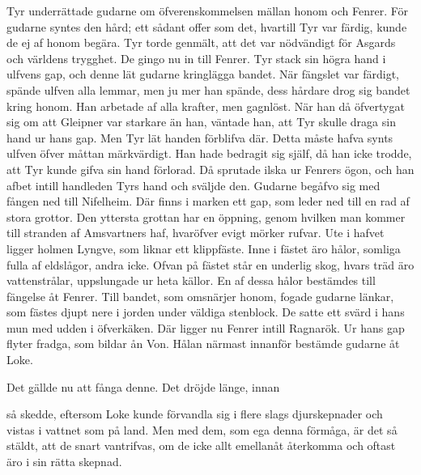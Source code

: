 Tyr underrättade gudarne om öfverenskommelsen mällan honom och Fenrer.
För gudarne syntes den hård; ett sådant offer som det, hvartill Tyr var
färdig, kunde de ej af honom begära. Tyr torde genmält, att det var
nödvändigt för Asgards och världens trygghet. De gingo nu in till
Fenrer. Tyr stack sin högra hand i ulfvens gap, och denne lät gudarne
kringlägga bandet. När fängslet var färdigt, spände ulfven alla lemmar,
men ju mer han spände, dess hårdare drog sig bandet kring honom. Han
arbetade af alla krafter, men gagnlöst. När han då öfvertygat sig om att
Gleipner var starkare än han, väntade han, att Tyr skulle draga sin hand
ur hans gap. Men Tyr lät handen förblifva där. Detta måste hafva synts
ulfven öfver måttan märkvärdigt. Han hade bedragit sig själf, då han
icke trodde, att Tyr kunde gifva sin hand förlorad. Då sprutade ilska ur
Fenrers ögon, och han afbet intill handleden Tyrs hand och sväljde den.
Gudarne begåfvo sig med fången ned till Nifelheim. Där finns i marken
ett gap, som leder ned till en rad af stora grottor. Den yttersta
grottan har en öppning, genom hvilken man kommer till stranden af
Amsvartners haf, hvaröfver evigt mörker rufvar. Ute i hafvet ligger
holmen Lyngve, som liknar ett klippfäste. Inne i fästet äro hålor,
somliga fulla af eldslågor, andra icke. Ofvan på fästet står en underlig
skog, hvars träd äro vattenstrålar, uppslungade ur heta källor. En af
dessa hålor bestämdes till fängelse åt Fenrer. Till bandet, som
omsnärjer honom, fogade gudarne länkar, som fästes djupt nere i jorden
under väldiga stenblock. De satte ett svärd i hans mun med udden i
öfverkäken. Där ligger nu Fenrer intill Ragnarök. Ur hans gap flyter
fradga, som bildar ån Von. Hålan närmast innanför bestämde gudarne åt
Loke.

Det gällde nu att fånga denne. Det dröjde länge, innan

så skedde, eftersom Loke kunde förvandla sig i flere slags djurskepnader
och vistas i vattnet som på land. Men med dem, som ega denna förmåga, är
det så stäldt, att de snart vantrifvas, om de icke allt emellanåt
återkomma och oftast äro i sin rätta skepnad.

